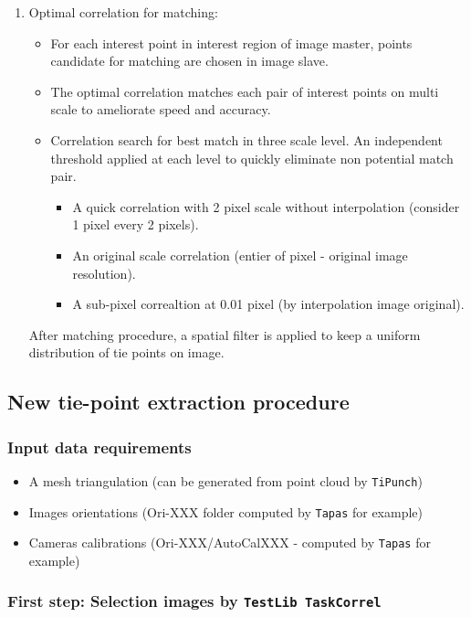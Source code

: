 \begin{enumerate}
\item Optimal correlation for matching:
\begin{itemize}
\item For each interest point in interest region of image master, points candidate for matching are chosen in image slave.
\item The optimal correlation matches each pair of interest points on multi scale to ameliorate speed and accuracy.
\item Correlation search for best match in three scale level. An independent threshold applied at each level to quickly eliminate non potential match pair. 
\begin{itemize}
 \item A quick correlation with 2 pixel scale without interpolation (consider 1 pixel every 2 pixels).
 \item An original scale correlation (entier of pixel - original image resolution). 
 \item A sub-pixel correaltion at 0.01 pixel (by interpolation image original). 
\end{itemize}
\end{itemize}
After matching procedure, a spatial filter is applied to keep a uniform distribution of tie points on image. 

\end{enumerate}




\subsection{New tie-point extraction procedure}
\subsubsection{Input data requirements}
\begin{itemize}
  \item A mesh triangulation (can be generated from point cloud by {\tt TiPunch}) 
  \item Images orientations (Ori-XXX folder computed by {\tt Tapas} for example)
  \item Cameras calibrations (Ori-XXX/AutoCalXXX - computed by {\tt Tapas} for example)
\end{itemize}
\subsubsection{First step: Selection images by {\tt TestLib TaskCorrel}}

